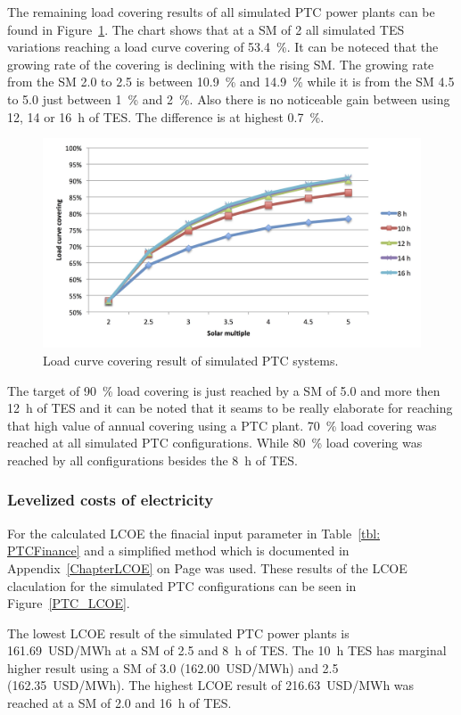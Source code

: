 The remaining load covering results of all simulated PTC power plants can be found in Figure~\ref{PTC_LCCF}. The chart shows that at a SM of 2 all simulated TES variations reaching a load curve covering of 53.4~\%. It can be noteced that the growing rate of the covering is declining with the rising SM. The growing rate from the SM 2.0 to 2.5 is between 10.9~\% and 14.9~\% while it is from the SM 4.5 to 5.0 just between 1~\% and 2~\%. Also there is no noticeable gain between using 12, 14 or 16~h of TES. The difference is at highest 0.7~\%. 

\begin{figure}[htbp]  
\centering
\includegraphics[width=1\linewidth]{FIG/PTC_LCCF}
\caption[Load curve covering result of simulated PTC systems.]{Load curve covering result of simulated PTC systems.}\label{PTC_LCCF}
\end{figure}
The target of 90~\% load covering is just reached by a SM of 5.0 and more then 12~h of TES and it can be noted that it seams to be really elaborate for reaching that high value of annual covering using a PTC plant. 70~\% load covering was reached at all simulated PTC configurations. While 80~\% load covering was reached by all configurations besides the 8~h of TES.
\subsubsection{Levelized costs of electricity}
For the calculated LCOE the finacial input parameter in Table~\ref{tbl: PTCFinance} and a simplified method which is documented in Appendix~\ref{ChapterLCOE} on Page \pageref{ChapterLCOE} was used. These results of the LCOE claculation for the simulated PTC configurations can be seen in Figure~\ref{PTC_LCOE}. 

The lowest LCOE result of the simulated PTC power plants is 161.69~USD/MWh at a SM of 2.5 and 8~h of TES. The 10~h TES has marginal higher result using a SM of 3.0 (162.00~USD/MWh) and 2.5 (162.35~USD/MWh). The highest LCOE result of 216.63~USD/MWh was reached at a SM of 2.0 and 16~h of TES. 

